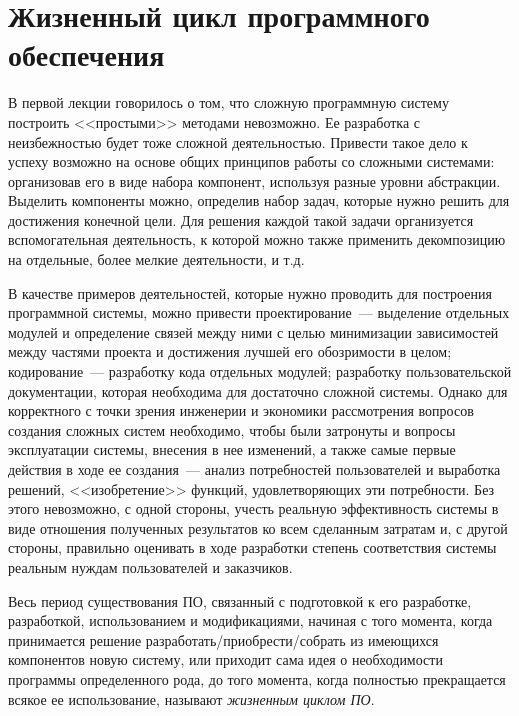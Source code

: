 \documentclass{../../text-style}
\begin{document}
\maketitle
\thispagestyle{empty}


\section{Жизненный цикл программного обеспечения}

В первой лекции говорилось о том, что сложную программную систему построить <<простыми>> методами невозможно. Ее разработка с неизбежностью будет тоже сложной деятельностью. Привести такое дело к успеху возможно на основе общих принципов работы со сложными системами: организовав его в виде набора компонент, используя разные уровни абстракции. Выделить компоненты можно, определив набор задач, которые нужно решить для достижения конечной цели. Для решения каждой такой задачи организуется вспомогательная деятельность, к которой можно также применить декомпозицию на отдельные, более мелкие деятельности, и т.д.

В качестве примеров деятельностей, которые нужно проводить для построения программной системы, можно привести проектирование~--- выделение отдельных модулей и определение связей между ними с целью минимизации зависимостей между частями проекта и достижения лучшей его обозримости в целом; кодирование~--- разработку кода отдельных модулей; разработку пользовательской документации, которая необходима для достаточно сложной системы. Однако для корректного с точки зрения инженерии и экономики рассмотрения вопросов создания сложных систем необходимо, чтобы были затронуты и вопросы эксплуатации системы, внесения в нее изменений, а также самые первые действия в ходе ее создания~--- анализ потребностей пользователей и выработка решений, <<изобретение>> функций, удовлетворяющих эти потребности. Без этого невозможно, с одной стороны, учесть реальную эффективность системы в виде отношения полученных результатов ко всем сделанным затратам и, с другой стороны, правильно оценивать в ходе разработки степень соответствия системы реальным нуждам пользователей и заказчиков.

Весь период существования ПО, связанный с подготовкой к его разработке, разработкой, использованием и модификациями, начиная с того момента, когда принимается решение разработать/приобрести/собрать из имеющихся компонентов новую систему, или приходит сама идея о необходимости программы определенного рода, до того момента, когда полностью прекращается всякое ее использование, называют \emph{жизненным циклом ПО}.
\end{document}
